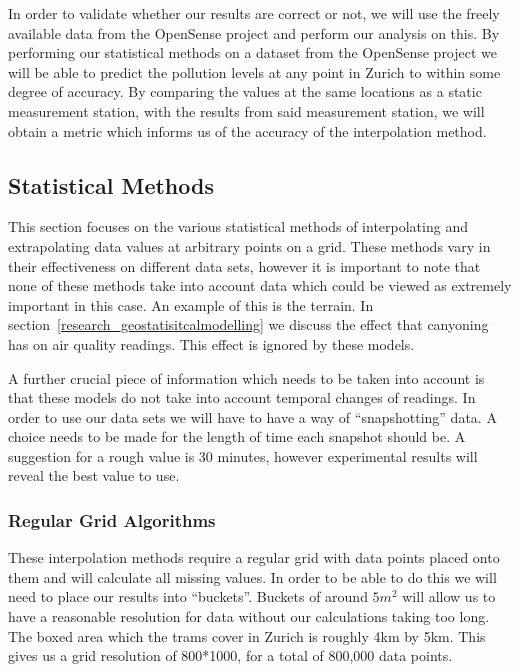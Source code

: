 	In order to validate whether our results are correct or not, we will use the freely available data from the OpenSense project and perform our analysis on this. By performing our statistical methods on a dataset from the OpenSense project we will be able to predict the pollution levels at any point in Zurich to within some degree of accuracy. By comparing the values at the same locations as a static measurement station, with the results from said measurement station, we will obtain a metric which informs us of the accuracy of the interpolation method.


	\subsection{Statistical Methods}\label{datavalidation_statisticalmethods}
		This section focuses on the various statistical methods of interpolating and extrapolating data values at arbitrary points on a grid. These methods vary in their effectiveness on different data sets, however it is important to note that none of these methods take into account data which could be viewed as extremely important in this case. An example of this is the terrain. In section~\ref{research_geostatisitcalmodelling} we discuss the effect that canyoning has on air quality readings. This effect is ignored by these models. 

		A further crucial piece of information which needs to be taken into account is that these models do not take into account temporal changes of readings. In order to use our data sets we will have to have a way of ``snapshotting'' data. A choice needs to be made for the length of time each snapshot should be. A suggestion for a rough value is 30 minutes, however experimental results will reveal the best value to use.



		\subsubsection{Regular Grid Algorithms}\label{datavalidation_regulargrid}

			These interpolation methods require a regular grid with data points placed onto them and will calculate all missing values. In order to be able to do this we will need to place our results into ``buckets''. Buckets of around $5m^{2}$ will allow us to have a reasonable resolution for data without our calculations taking too long. The boxed area which the trams cover in Zurich is roughly 4km by 5km. This gives us a grid resolution of 800*1000, for a total of 800,000 data points. 

